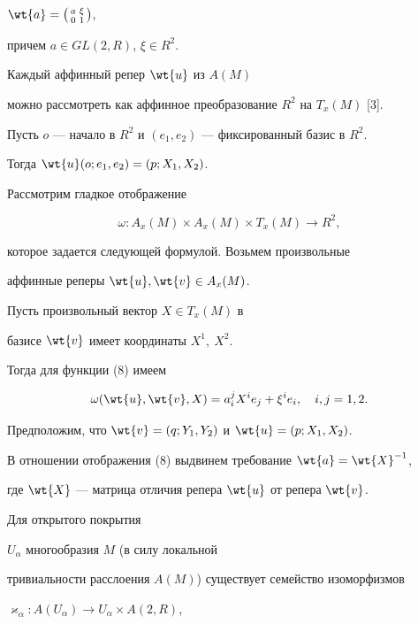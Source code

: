 $\wt{a} =\left(\begin{smallmatrix}


a&\xi\\ 0&1\end{smallmatrix}\right)$,


причем $a \in GL(2,R)$, $\xi \in R^2$.


Каждый аффинный репер $\wt{u}$ из $A(M)$


можно рассмотреть как аффинное преобразование $R^2$ на $T_x(M)$ [3].


Пусть $o$ --- начало в $R^2$ и $(e_1,e_2)$ --- фиксированный базис в $R^2$.


Тогда $\wt{u}(o;e_1,e_2)=(p;X_1,X_2)$.





Рассмотрим гладкое отображение


\begin{equation}


\omega: A_x(M)\times A_x(M)\times T_x(M) \to R^2,


\end{equation}


которое задается следующей формулой. Возьмем произвольные


аффинные реперы $\wt{u},\wt{v} \in A_x(M)$.


Пусть произвольный вектор $X \in T_x(M)$ в


базисе $\wt{v}$ имеет координаты $X^1,\ X^2$.


Тогда для функции (8) имеем


\begin{equation}


\omega(\wt{u},\wt{v},X)=a_i^jX^ie_j+\xi^ie_i,\quad i,j=1,2.


\end{equation}


Предположим, что $\wt{v}=(q;Y_1,Y_2)$ и $\wt{u}=(p;X_1,X_2)$.


В отношении отображения (8) выдвинем требование $\wt{a}=\wt{X}^{-1}$,


где $\wt{X}$ --- матрица отличия репера $\wt{u}$ от репера $\wt{v}$.


Для открытого покрытия


$U_{\alpha}$ многообразия $M$ (в силу локальной


тривиальности расслоения $A(M)$) существует семейство изоморфизмов


$\varkappa_{\alpha}: A(U_{\alpha}) \to U_{\alpha}\times A(2,R)$,



